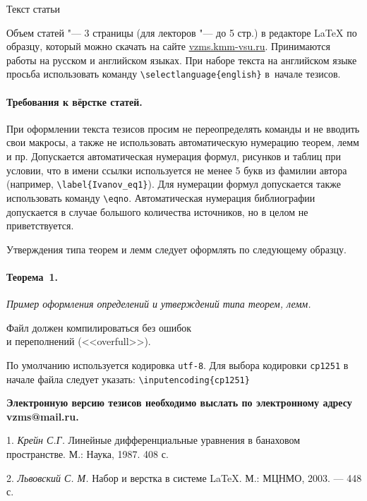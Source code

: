 \documentclass{vzmsthesis}
\begin{document}

\vzmscaption


Текст статьи


Объем статей "--- 3 страницы (для лекторов "--- до 5 стр.)
в редакторе \LaTeX{} по образцу, который можно скачать на
сайте \href{https://vzms.kmm-vsu.ru}{vzms.kmm-vsu.ru}.
Принимаются работы на русском и английском языках.
При наборе текста на английском языке просьба использовать команду
\verb`\selectlanguage{english}`
в~начале тезисов.

\paragraph{Требования к вёрстке статей.}
При оформлении текста тезисов просим не переопределять команды и не
вводить свои макросы, а также не использовать автоматическую
нумерацию теорем, лемм и пр.
Допускается автоматическая нумерация формул, рисунков и таблиц
при условии, что в имени ссылки используется не менее 5 букв из фамилии автора
(например, \verb`\label{Ivanov_eq1}`).
Для нумерации формул допускается также использовать команду \verb"\eqno".
Автоматическая нумерация библиографии допускается в случае большого количества источников,
но в целом не приветствуется.

Утверждения типа теорем и лемм следует оформлять по следующему
образцу.

\paragraph{Теорема~1.} {\it
	Пример оформления определений и утверждений типа теорем, лемм.
}

\begin{center}
	Файл должен компилироваться без ошибок \\
	и переполнений (<<overfull>>).
\end{center}

По умолчанию используется кодировка \verb`utf-8`.
Для выбора кодировки \verb`cp1251` в начале файла следует указать:
\verb`\inputencoding{cp1251}`


\begin{center}
	\textbf{Электронную версию тезисов необходимо выслать по электронному адресу vzms@mail.ru.}
\end{center}

\litlist

1. {\it Крейн С.Г.} Линейные дифференциальные уравнения в банаховом пространстве. М.: Наука, 1987. 408 с.

2. {\it Львовский С. М.} Набор и верстка в системе \LaTeX. М.: МЦНМО, 2003. — 448 с.
\end{document}
